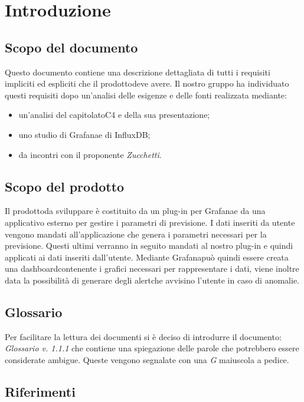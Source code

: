 
\section{Introduzione}
	\subsection{Scopo del documento}
	Questo documento contiene una descrizione dettagliata di tutti i requisiti impliciti ed espliciti che il prodotto\glosp deve avere. Il nostro gruppo ha individuato questi requisiti dopo un'analisi delle esigenze e delle fonti realizzata mediante: 
	\begin{itemize}
		\item un'analisi del capitolato\glosp C4 e della sua presentazione; 
		\item uno studio di Grafana\glosp e di InfluxDB;
		\item da incontri con il proponente \textit{Zucchetti}.
	\end{itemize}
	\subsection{Scopo del prodotto}
	Il prodotto\glosp da sviluppare è costituito da un plug-in per Grafana\glosp e da una applicativo esterno per gestire i parametri di previsione. I dati inseriti da utente vengono mandati all'applicazione che genera i parametri necessari per la previsione. Questi ultimi verranno in seguito mandati al nostro plug-in e quindi applicati ai dati inseriti dall'utente. Mediante Grafana\glosp può quindi essere creata una dashboard\glosp contenente i grafici necessari per rappresentare i dati, viene inoltre data la possibilità di generare degli alert\glosp che avvisino l'utente in caso di anomalie.
		
	\subsection{Glossario}
	Per facilitare la lettura dei documenti si è deciso di introdurre il documento: \textit{Glossario v. 1.1.1} che contiene una spiegazione delle parole che potrebbero essere considerate ambigue. Queste vengono segnalate con una \textit{G} maiuscola a pedice.  
	\subsection{Riferimenti}
